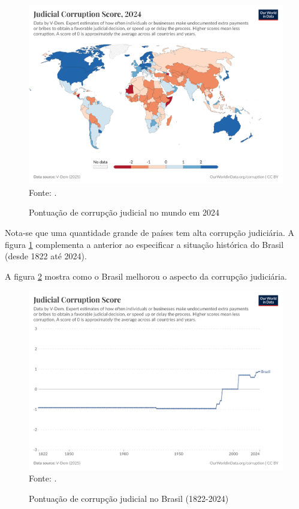 \begin{figure}[H]
	\centering
	\caption{Pontuação de corrupção judicial no mundo em 2024}
	\includegraphics[width=1\linewidth]{figuras/judicial-corruption-score.png}
	\label{fig:judicial-corruption-score}
	\footnotesize{Fonte: \cite{judicial-corruption-score}.}
\end{figure}

Nota-se que uma quantidade grande de países tem alta corrupção judiciária. A figura \ref{fig:judicial-corruption-score} complementa a anterior ao especificar a situação histórica do Brasil (desde 1822 até 2024).

A figura \ref{fig:judicial-corruption-score-brazil} mostra como o Brasil melhorou o aspecto da corrupção judiciária. 

\begin{figure}[H]
    \centering
    \caption{Pontuação de corrupção judicial no Brasil (1822-2024)}
    \includegraphics[width=1\linewidth]{figuras/judicial-corruption-score-brazil.png}
    \label{fig:judicial-corruption-score-brazil}
    \footnotesize{Fonte: \cite{judicial-corruption-score}.}
\end{figure}

